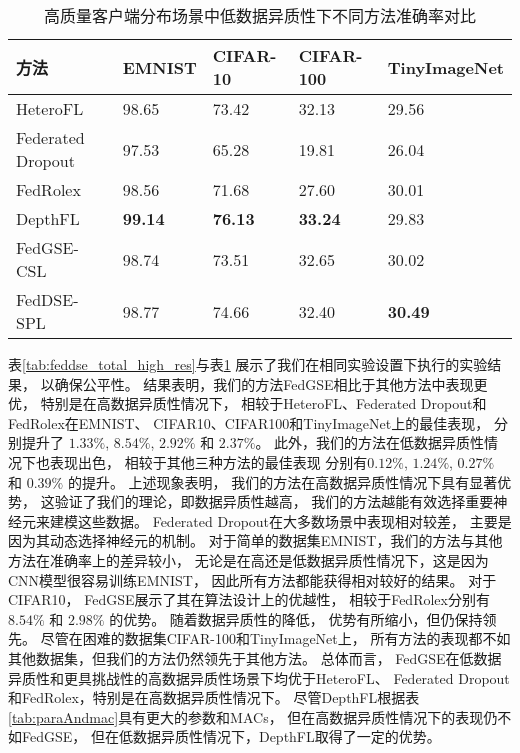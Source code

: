 \begin{table}[thbp]
    \caption{\label{tab:feddse_total_low_res}高质量客户端分布场景中低数据异质性下不同方法准确率对比}
    \begin{tabularx}{\linewidth}{l X<{\centering} X<{\centering} X<{\centering} X<{\centering}}
        \toprule
        方法 & EMNIST & CIFAR-10 & CIFAR-100 & TinyImageNet \\ \hline
        HeteroFL & 98.65 & 73.42 & 32.13 & 29.56 \\ 
        Federated Dropout & 97.53 & 65.28 & 19.81 & 26.04 \\ 
        FedRolex & 98.56 & 71.68 & 27.60 & 30.01 \\ 
        DepthFL & \textbf{99.14} & \textbf{76.13} & \textbf{33.24} & 29.83 \\ 
        FedGSE-CSL & 98.74 & 73.51  & 32.65 & 30.02  \\ 
        FedDSE-SPL & 98.77 & 74.66  & 32.40 &\textbf{30.49} \\ 
        \bottomrule
    \end{tabularx}
\end{table}
表\ref{tab:feddse_total_high_res}与表\ref{tab:feddse_total_low_res}
展示了我们在相同实验设置下执行的实验结果，
以确保公平性。
结果表明，我们的方法FedGSE相比于其他方法中表现更优，
特别是在高数据异质性情况下，
相较于HeteroFL、Federated Dropout和FedRolex在EMNIST、
CIFAR10、CIFAR100和TinyImageNet上的最佳表现，
分别提升了
$1.33\%$, $8.54\%$, $2.92\%$ 和 $2.37\%$。
此外，我们的方法在低数据异质性情况下也表现出色，
相较于其他三种方法的最佳表现
分别有$0.12\%$, $1.24\%$, $0.27\%$ 和 $0.39\%$ 
的提升。
上述现象表明，
我们的方法在高数据异质性情况下具有显著优势，
这验证了我们的理论，即数据异质性越高，
我们的方法越能有效选择重要神经元来建模这些数据。
Federated Dropout在大多数场景中表现相对较差，
主要是因为其动态选择神经元的机制。
对于简单的数据集EMNIST，我们的方法与其他方法在准确率上的差异较小，
无论是在高还是低数据异质性情况下，这是因为CNN模型很容易训练EMNIST，
因此所有方法都能获得相对较好的结果。
对于CIFAR10，
FedGSE展示了其在算法设计上的优越性，
相较于FedRolex分别有$8.54\%$ 和 $2.98\%$ 的优势。
随着数据异质性的降低，
优势有所缩小，但仍保持领先。
尽管在困难的数据集CIFAR-100和TinyImageNet上，
所有方法的表现都不如其他数据集，但我们的方法仍然领先于其他方法。
总体而言，
FedGSE在低数据异质性和更具挑战性的高数据异质性场景下均优于HeteroFL、
Federated Dropout和FedRolex，特别是在高数据异质性情况下。
尽管DepthFL根据表\ref{tab:paraAndmac}具有更大的参数和MACs，
但在高数据异质性情况下的表现仍不如FedGSE，
但在低数据异质性情况下，DepthFL取得了一定的优势。

